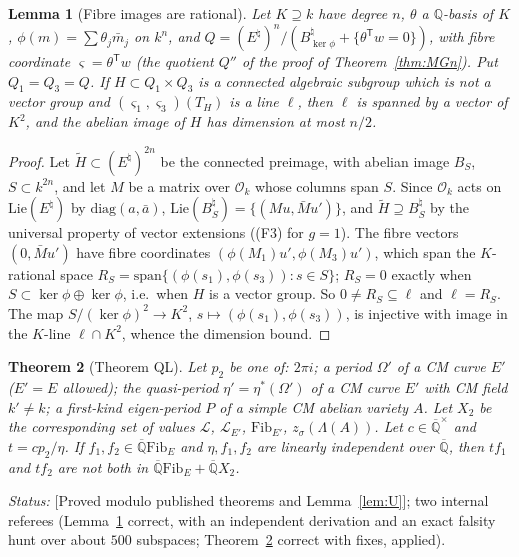 \documentclass[11pt]{amsart}
\newtheorem{theorem}{Theorem}[section]
\newtheorem{lemma}[theorem]{Lemma}
\theoremstyle{definition}
\newcommand{\Qb}{\overline{\mathbb{Q}}}
\newcommand{\Q}{\mathbb{Q}}
\newcommand{\Lg}{\mathcal{L}}
\newcommand{\Fib}{\mathrm{Fib}}
\newcommand{\lab}[1]{\textup{[#1]}}
\newcommand{\LabC}{\lab{Proved modulo published theorems and Lemma~\ref{lem:U}}}
\newcommand{\Status}{\noindent\emph{Status:} }
\begin{document}
\begin{lemma}[Fibre images are rational]\label{lem:F}
Let $K\supseteq k$ have degree $n$, $\theta$ a $\Q$-basis of $K$, $\phi(m)=\sum\theta_j\bar m_j$ on $k^n$, and
$Q=(E^\natural)^n/(B^\natural_{\ker\phi}+\{\theta^{\mathsf T}w=0\})$, with fibre coordinate $\varsigma=\theta^{\mathsf T}w$ (the
quotient $Q''$ of the proof of Theorem~\ref{thm:MGn}). Put $Q_1=Q_3=Q$. If $H\subset Q_1\times Q_3$ is a connected algebraic
subgroup which is not a vector group and $(\varsigma_1,\varsigma_3)(T_H)$ is a line $\ell$, then $\ell$ is spanned by a
vector of $K^2$, and the abelian image of $H$ has dimension at most $n/2$.
\end{lemma}

\begin{proof}
Let $\tilde H\subset(E^\natural)^{2n}$ be the connected preimage, with abelian image $B_S$, $S\subset k^{2n}$, and let $M$
be a matrix over $\mathcal O_k$ whose columns span $S$. Since $\mathcal O_k$ acts on $\mathrm{Lie}(E^\natural)$ by
$\mathrm{diag}(a,\bar a)$, $\mathrm{Lie}(B_S^\natural)=\{(Mu,\bar Mu')\}$, and $\tilde H\supseteq B_S^\natural$ by the
universal property of vector extensions ((F3) for $g=1$). The fibre vectors $(0,\bar Mu')$ have fibre coordinates
$(\phi(M_1)u',\phi(M_3)u')$, which span the $K$-rational space $R_S=\mathrm{span}\{(\phi(s_1),\phi(s_3)):s\in S\}$;
$R_S=0$ exactly when $S\subset\ker\phi\oplus\ker\phi$, i.e.\ when $H$ is a vector group. So $0\ne R_S\subseteq\ell$ and
$\ell=R_S$. The map $S/(\ker\phi)^2\to K^2$, $s\mapsto(\phi(s_1),\phi(s_3))$, is injective with image in the $K$-line
$\ell\cap K^2$, whence the dimension bound.
\end{proof}

\begin{theorem}[Theorem QL]\label{thm:QL}
Let $p_2$ be one of: $2\pi i$; a period $\Omega'$ of a CM curve $E'$ ($E'=E$ allowed); the quasi-period
$\eta'=\eta^*(\Omega')$ of a CM curve $E'$ with CM field $k'\neq k$; a first-kind eigen-period $P$ of a simple CM abelian
variety $A$. Let $X_2$ be the corresponding set of values $\Lg$, $\Lg_{E'}$, $\Fib_{E'}$, $z_\sigma(\Lambda(A))$. Let
$c\in\Qb^\times$ and $t=cp_2/\eta$. If $f_1,f_2\in\Qb\Fib_E$ and $\eta,f_1,f_2$ are linearly independent over $\Qb$, then
$tf_1$ and $tf_2$ are not both in $\Qb\Fib_E+\Qb X_2$.
\end{theorem}

\Status \LabC; two internal referees (Lemma~\ref{lem:F} correct, with an independent derivation and an exact falsity hunt
over about $500$ subspaces; Theorem~\ref{thm:QL} correct with fixes, applied).
\end{document}
